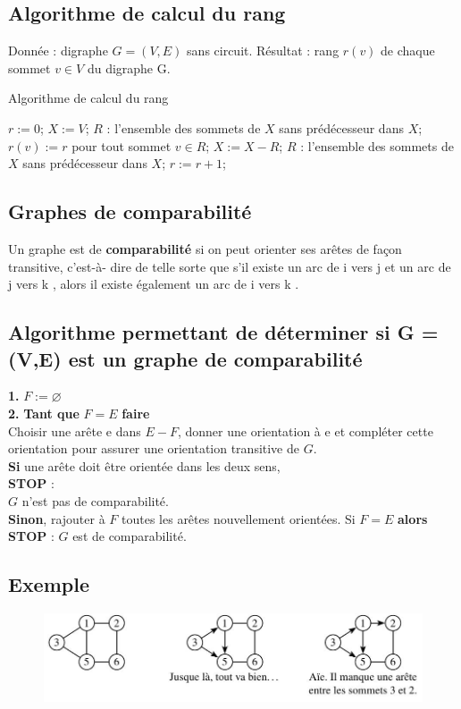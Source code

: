 \subsection*{Algorithme de calcul du rang}
Donnée : digraphe $ G = (V, E) $ sans circuit.
Résultat : rang $ r(v) $ de chaque sommet $ v \in V $ du digraphe G.

\begin{algorithm}
	\caption{Algorithme de calcul du rang}\label{euclid}
	\begin{algorithmic}[1]
		\Procedure{}{}
		\State $r := 0 $;
		\State $X := V $;
		\State $ R $ : l'ensemble des sommets de $ X $ sans prédécesseur dans $ X $;
		\State $ r(v) := r $ pour tout sommet $ v \in R $;
		\State $ X := X - R $;
		\State $ R $ : l'ensemble des sommets de $ X $ sans prédécesseur dans $ X$;
		\State $ r := r + 1$;
		\EndWhile
		\EndProcedure
	\end{algorithmic}
\end{algorithm}

\subsection{Graphes de comparabilité}
Un graphe est de \textbf{comparabilité} si on peut orienter ses arêtes de façon transitive, c'est-à-
dire de telle sorte que s'il existe un arc de i vers j et un arc de j vers k , alors il existe
également un arc de i vers k .

\subsection*{Algorithme permettant de déterminer si G = (V,E) est un graphe de comparabilité}
\noindent \textbf{1.} $ F := \varnothing $\\
\textbf{2.} \textbf{Tant que} $ F = E $ \textbf{faire}\\
Choisir une arête e dans $ E - F  $, donner une orientation à e et compléter cette
orientation pour assurer une orientation transitive de $ G $.\\
\textbf{Si} une arête doit être orientée dans les deux sens,\\ \textbf{STOP} :\\
$ G $ n'est pas de comparabilité.\\
\textbf{Sinon}, rajouter à $ F $ toutes les arêtes nouvellement orientées. Si $ F = E $ \textbf{alors}\\
\textbf{STOP} :
$ G $ est de comparabilité.
\subsection*{Exemple}
\begin{figure}[h]
\centering
\includegraphics[width=\linewidth]{images/graph25}
\end{figure}
\newpage
